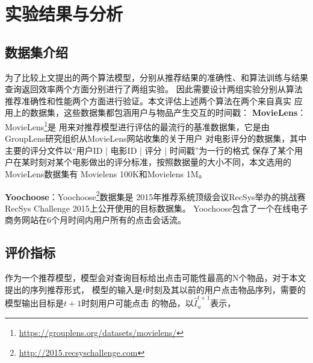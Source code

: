 ﻿\chapter{实验结果与分析}

\section{数据集介绍}

为了比较上文提出的两个算法模型，分别从推荐结果的准确性、和算法训练与结果查询返回效率两个方面分别进行了两组实验。%
因此需要设计两组实验分别从算法推荐准确性和性能两个方面进行验证。本文评估上述两个算法在两个来自真实%
应用上的数据集，这些数据集都包涵用户与物品产生交互的时间戳：
\textbf{MovieLens}：MovieLens\footnote{\url{https://grouplens.org/datasets/movielens/}}是%
用来对推荐模型进行评估的最流行的基准数据集，它是由GroupLens研究组织从MovieLens网站收集的关于用户%
对电影评分的数据集，其中主要的评分文件以“用户ID | 电影ID | 评分 | 时间戳”为一行的格式%
保存了某个用户在某时刻对某个电影做出的评分标准，按照数据量的大小不同，本文选用的MovieLens数据集有%
Movielens 100K和Movielens 1M。

\textbf{Yoochoose}：Yoochoose\footnote{\url{http://2015.recsyschallenge.com}}数据集是%
2015年推荐系统顶级会议RecSys举办的挑战赛RecSys Challenge 2015上公开使用的目标数据集。%
Yoochoose包含了一个在线电子商务网站在6个月时间内用户所有的点击会话流。%




\section{评价指标}
作为一个推荐模型，模型会对查询目标给出点击可能性最高的N个物品，对于本文提出的序列推荐形式，%
模型的输入是$t$时刻及其以前的用户点击物品序列，需要的模型输出目标是$t+1$时刻用户可能点击%
的物品，以$\hat{I}_{u}^{t+1}$表示，


